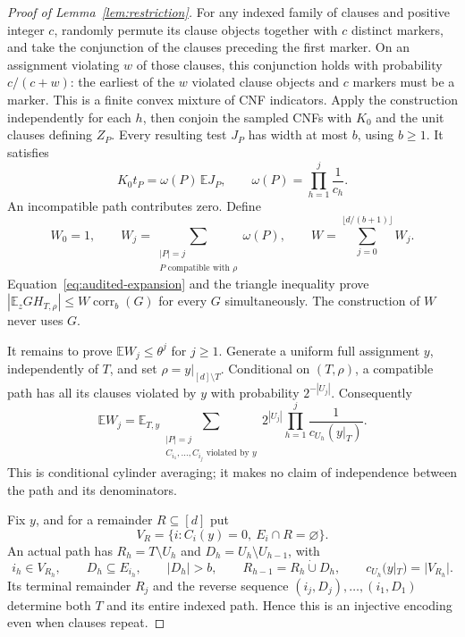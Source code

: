 \documentclass[11pt,letterpaper]{article}
\theoremstyle{definition}
\numberwithin{equation}{section}
\newcommand{\E}{\mathbb E}
\DeclareMathOperator{\corr}{corr}
\begin{document}
\begin{proof}[Proof of Lemma~\ref{lem:restriction}]
For any indexed family of clauses and positive integer $c$, randomly
permute its clause objects together with $c$ distinct markers, and take
the conjunction of the clauses preceding the first marker. On an assignment
violating $w$ of those clauses, this conjunction holds with probability
$c/(c+w)$: the earliest of the $w$ violated clause objects and $c$ markers
must be a marker. This is a finite convex mixture of CNF indicators.
Apply the construction independently for each $h$, then conjoin the sampled
CNFs with $K_0$ and the unit clauses defining $Z_P$. Every resulting test
$J_P$ has width at most $b$, using $b\ge1$. It satisfies
\[
 K_0t_P=\omega(P)\,\E J_P,
 \qquad \omega(P)=\prod_{h=1}^j\frac1{c_h}.
\]
An incompatible path contributes zero. Define
\[
 W_0=1,\qquad
 W_j=\sum_{\substack{|P|=j\\P\text{ compatible with }\rho}}\omega(P),
 \qquad W=\sum_{j=0}^{\lfloor d/(b+1)\rfloor}W_j.
\]
Equation~\eqref{eq:audited-expansion} and the triangle inequality prove
$|\E_zGH_{T,\rho}|\le W\corr_b(G)$ for every $G$ simultaneously.
The construction of $W$ never uses $G$.

It remains to prove $\E W_j\le\theta^j$ for $j\ge1$.
Generate a uniform full assignment $y$, independently of $T$, and set
$\rho=y|_{[d]\setminus T}$. Conditional on $(T,\rho)$, a compatible path
has all its clauses violated by $y$ with probability $2^{-|U_j|}$.
Consequently
\begin{equation}\label{eq:audited-reweight}
 \E W_j=\E_{T,y}
 \sum_{\substack{|P|=j\\C_{i_1},\ldots,C_{i_j}\text{ violated by }y}}
 2^{|U_j|}\prod_{h=1}^j\frac1{c_{U_h}(y|_T)}.
\end{equation}
This is conditional cylinder averaging; it makes no claim of independence
between the path and its denominators.

Fix $y$, and for a remainder $R\subseteq[d]$ put
\[
 V_R=\{i:C_i(y)=0,\ E_i\cap R=\varnothing\}.
\]
An actual path has $R_h=T\setminus U_h$ and
$D_h=U_h\setminus U_{h-1}$, with
\[
 i_h\in V_{R_h},\qquad D_h\subseteq E_{i_h},\qquad |D_h|>b,
 \qquad R_{h-1}=R_h\mathbin{\dot\cup}D_h,\qquad
 c_{U_h}(y|_T)=|V_{R_h}|.
\]
Its terminal remainder $R_j$ and the reverse sequence
$(i_j,D_j),\ldots,(i_1,D_1)$ determine both $T$ and its entire indexed
path. Hence this is an injective encoding even when clauses repeat.


\end{proof}
\end{document}
